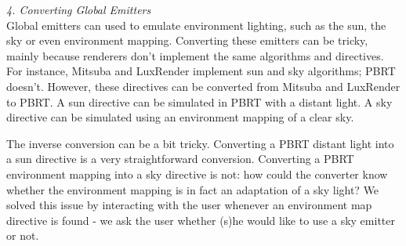 


\textit{4. Converting Global Emitters} \\
Global emitters can used to emulate environment lighting, such as the sun, the
sky or even environment mapping. Converting these emitters can be tricky, mainly
because renderers don't implement the same algorithms and directives. For
instance, Mitsuba and LuxRender implement sun and sky algorithms; PBRT doesn't.
However, these directives can be converted from Mitsuba and LuxRender to PBRT. A
sun directive can be simulated in PBRT with a distant light. A sky directive can
be simulated using an environment mapping of a clear sky.

The inverse conversion can be a bit tricky. Converting a PBRT distant light into
a sun directive is a very straightforward conversion. Converting a PBRT
environment mapping into a sky directive is not: how could the converter know
whether the environment mapping is in fact an adaptation of a sky light? We
solved this issue by interacting with the user whenever an environment map
directive is found - we ask the user whether (s)he would like to use a sky
emitter or not.

